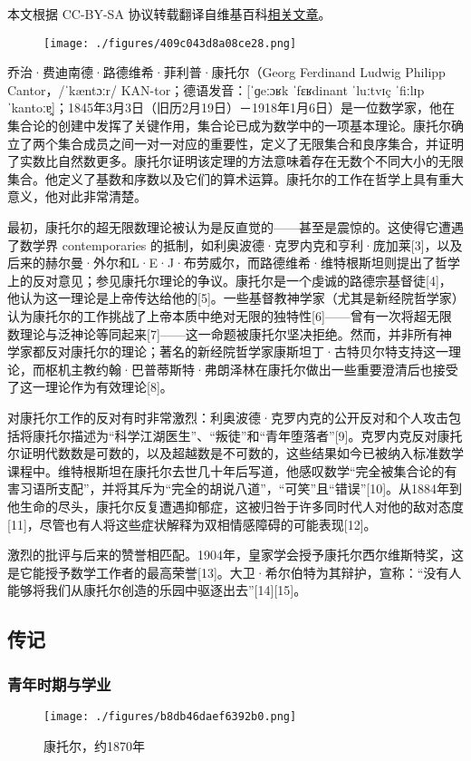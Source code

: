 
本文根据 CC-BY-SA 协议转载翻译自维基百科\href{https://en.wikipedia.org/wiki/Georg_Cantor}{相关文章}。

\begin{figure}[ht]
\centering
\texttt{[image: ./figures/409c043d8a08ce28.png]}
\caption{} \label{fig_Canto_1}
\end{figure}
乔治·费迪南德·路德维希·菲利普·康托尔（Georg Ferdinand Ludwig Philipp Cantor，/ˈkæntɔːr/ KAN-tor；德语发音：[ˈɡeːɔʁk ˈfɛʁdinant ˈluːtvɪç ˈfiːlɪp ˈkantoːɐ̯]；1845年3月3日（旧历2月19日）－1918年1月6日）是一位数学家，他在集合论的创建中发挥了关键作用，集合论已成为数学中的一项基本理论。康托尔确立了两个集合成员之间一对一对应的重要性，定义了无限集合和良序集合，并证明了实数比自然数更多。康托尔证明该定理的方法意味着存在无数个不同大小的无限集合。他定义了基数和序数以及它们的算术运算。康托尔的工作在哲学上具有重大意义，他对此非常清楚。

最初，康托尔的超无限数理论被认为是反直觉的——甚至是震惊的。这使得它遭遇了数学界 contemporaries 的抵制，如利奥波德·克罗内克和亨利·庞加莱[3]，以及后来的赫尔曼·外尔和L·E·J·布劳威尔，而路德维希·维特根斯坦则提出了哲学上的反对意见；参见康托尔理论的争议。康托尔是一个虔诚的路德宗基督徒[4]，他认为这一理论是上帝传达给他的[5]。一些基督教神学家（尤其是新经院哲学家）认为康托尔的工作挑战了上帝本质中绝对无限的独特性[6]——曾有一次将超无限数理论与泛神论等同起来[7]——这一命题被康托尔坚决拒绝。然而，并非所有神学家都反对康托尔的理论；著名的新经院哲学家康斯坦丁·古特贝尔特支持这一理论，而枢机主教约翰·巴普蒂斯特·弗朗泽林在康托尔做出一些重要澄清后也接受了这一理论作为有效理论[8]。

对康托尔工作的反对有时非常激烈：利奥波德·克罗内克的公开反对和个人攻击包括将康托尔描述为“科学江湖医生”、“叛徒”和“青年堕落者”[9]。克罗内克反对康托尔证明代数数是可数的，以及超越数是不可数的，这些结果如今已被纳入标准数学课程中。维特根斯坦在康托尔去世几十年后写道，他感叹数学“完全被集合论的有害习语所支配”，并将其斥为“完全的胡说八道”，“可笑”且“错误”[10]。从1884年到他生命的尽头，康托尔反复遭遇抑郁症，这被归咎于许多同时代人对他的敌对态度[11]，尽管也有人将这些症状解释为双相情感障碍的可能表现[12]。

激烈的批评与后来的赞誉相匹配。1904年，皇家学会授予康托尔西尔维斯特奖，这是它能授予数学工作者的最高荣誉[13]。大卫·希尔伯特为其辩护，宣称：“没有人能够将我们从康托尔创造的乐园中驱逐出去”[14][15]。
\subsection{传记}  
\subsubsection{青年时期与学业}
\begin{figure}[ht]
\centering
\texttt{[image: ./figures/b8db46daef6392b0.png]}
\caption{康托尔，约1870年} \label{fig_Canto_2}
\end{figure}
